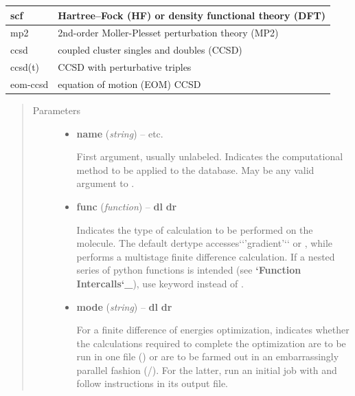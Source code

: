\documentclass[letterpaper,10pt,english]{sphinxmanual}
\begin{document}
\begin{fulllineitems}
\begin{tabulary}{\linewidth}{|L|L|}
scf
 & 
Hartree--Fock (HF) or density functional theory (DFT)
\\\hline

mp2
 & 
2nd-order Moller-Plesset perturbation theory (MP2)
\\\hline

ccsd
 & 
coupled cluster singles and doubles (CCSD)
\\\hline

ccsd(t)
 & 
CCSD with perturbative triples
\\\hline

eom-ccsd
 & 
equation of motion (EOM) CCSD
\\\hline
\end{tabulary}

\begin{quote}\begin{description}
\item[{Parameters}] \leavevmode\begin{itemize}
\item {} 
\textbf{name} (\emph{string}) -- 
 \textbar{}\textbar{}  \textbar{}\textbar{}  \textbar{}\textbar{} etc.

First argument, usually unlabeled. Indicates the computational method
to be applied to the database. May be any valid argument to
{\hyperref[opt:driver.energy]{}}.


\item {} 
\textbf{func} (\emph{function}) -- 
{\color{red}\bfseries{}\textbar{}dl\textbar{}}  {\color{red}\bfseries{}\textbar{}dr\textbar{}} \textbar{}\textbar{}  \textbar{}\textbar{} 

Indicates the type of calculation to be performed on the molecule.
The default dertype accesses{}`{}`'gradient'{}`{}` or , while
 performs a multistage finite difference calculation.
If a nested series of python functions is intended (see {\color{red}\bfseries{}{}`Function Intercalls{}`\_}),
use keyword  instead of .


\item {} 
\textbf{mode} (\emph{string}) -- 
{\color{red}\bfseries{}\textbar{}dl\textbar{}}  {\color{red}\bfseries{}\textbar{}dr\textbar{}} \textbar{}\textbar{}  \textbar{}\textbar{} 

For a finite difference of energies optimization, indicates whether
the calculations required to complete the
optimization are to be run in one file () or are to be
farmed out in an embarrassingly parallel fashion
(/).  For the latter, run an initial job with
 and follow instructions in its output file.



\end{itemize}
\end{description}
\end{quote}
\end{fulllineitems}
\end{document}
